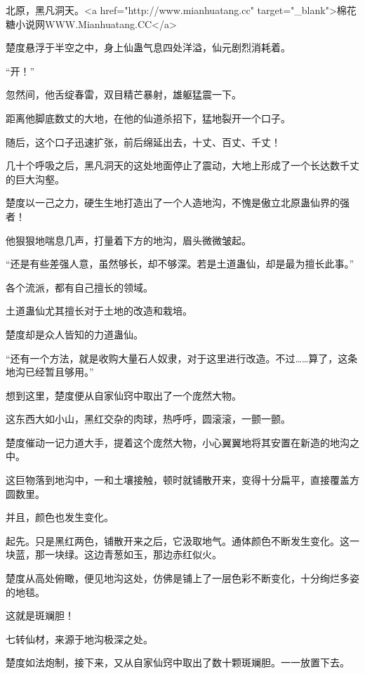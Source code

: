 
\begin{this_body}

北原，黑凡洞天。<a href="http://www.mianhuatang.cc" target="\_blank">棉花糖小说网WWW.Mianhuatang.CC</a>

楚度悬浮于半空之中，身上仙蛊气息四处洋溢，仙元剧烈消耗着。

“开！”

忽然间，他舌绽春雷，双目精芒暴射，雄躯猛震一下。

距离他脚底数丈的大地，在他的仙道杀招下，猛地裂开一个口子。

随后，这个口子迅速扩张，前后绵延出去，十丈、百丈、千丈！

几十个呼吸之后，黑凡洞天的这处地面停止了震动，大地上形成了一个长达数千丈的巨大沟壑。

楚度以一己之力，硬生生地打造出了一个人造地沟，不愧是傲立北原蛊仙界的强者！

他狠狠地喘息几声，打量着下方的地沟，眉头微微皱起。

“还是有些差强人意，虽然够长，却不够深。若是土道蛊仙，却是最为擅长此事。”

各个流派，都有自己擅长的领域。

土道蛊仙尤其擅长对于土地的改造和栽培。

楚度却是众人皆知的力道蛊仙。

“还有一个方法，就是收购大量石人奴隶，对于这里进行改造。不过……算了，这条地沟已经暂且够用。”

想到这里，楚度便从自家仙窍中取出了一个庞然大物。

这东西大如小山，黑红交杂的肉球，热呼呼，圆滚滚，一颤一颤。

楚度催动一记力道大手，提着这个庞然大物，小心翼翼地将其安置在新造的地沟之中。

这巨物落到地沟中，一和土壤接触，顿时就铺散开来，变得十分扁平，直接覆盖方圆数里。

并且，颜色也发生变化。

起先。只是黑红两色，铺散开来之后，它汲取地气。通体颜色不断发生变化。这一块蓝，那一块绿。这边青葱如玉，那边赤红似火。

楚度从高处俯瞰，便见地沟这处，仿佛是铺上了一层色彩不断变化，十分绚烂多姿的地毯。

这就是斑斓胆！

七转仙材，来源于地沟极深之处。

楚度如法炮制，接下来，又从自家仙窍中取出了数十颗斑斓胆。一一放置下去。


\end{this_body}
